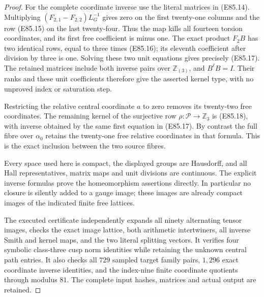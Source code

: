 \begin{proof}
For the complete coordinate inverse use the
literal matrices in (E85.14). Multiplying
$(F_{2,1}-F_{2,2})L_G^{-1}$ gives zero on
the first twenty-one columns and the row
(E85.15) on the last twenty-four. Thus the
map kills all fourteen torsion coordinates,
and its first free coefficient is minus one.
The exact product $F_2B$ has two identical
rows, equal to three times (E85.16); its
eleventh coefficient after division by three
is one. Solving these two unit equations
gives precisely (E85.17). The retained
matrices include both inverse pairs over
$\mathbb Z_{(3)}$, and $B^{\ell}B=I$.
Their ranks and these unit coefficients
therefore give the asserted kernel type,
with no unproved index or saturation step.

Restricting the relative central coordinate
$a$ to zero removes its twenty-two free
coordinates. The remaining kernel of the
surjective row $\rho:\mathcal P\to\mathbb Z_3$
is (E85.18), with inverse obtained by the
same first equation in (E85.17). By contrast
the full fibre over $\alpha_0$ retains the
twenty-one free relative coordinates in
that formula. This is the exact inclusion
between the two source fibres.

Every space used here is compact, the
displayed groups are Hausdorff, and all
Hall representatives, matrix maps and
unit divisions are continuous. The explicit
inverse formulas prove the homeomorphism
assertions directly. In particular no
closure is silently added to a gauge image;
these images are already compact images
of the indicated finite free lattices.

The executed certificate independently
expands all ninety alternating tensor
images, checks the exact image lattice,
both arithmetic intertwiners, all inverse
Smith and kernel maps, and the two literal
splitting vectors. It verifies four symbolic
class-three cusp norm identities while
retaining the unknown central path entries.
It also checks all $729$ sampled target
family pairs, $1,296$ exact coordinate
inverse identities, and the index-nine
finite coordinate quotients through
modulus $81$. The complete input hashes,
matrices and actual output are retained.
\end{proof}
